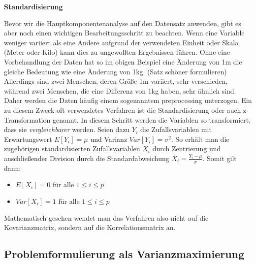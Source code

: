 \textbf{Standardisierung}

Bevor wir die Hauptkomponentenanalyse auf den Datensatz anwenden, gibt es aber noch einen wichtigen Bearbeitungsschritt zu beachten. Wenn eine Variable weniger variiert als eine Andere aufgrund der verwendeten Einheit oder Skala (Meter oder Kilo) kann dies zu ungewollten Ergebnissen führen. Ohne eine Vorbehandlung der Daten hat so im obigen Beispiel eine Änderung von 1m die gleiche Bedeutung wie eine Änderung von 1kg. (Satz schöner formulieren) Allerdings sind zwei Menschen, deren Größe 1m variiert, sehr verschieden, während zwei Menschen, die eine Differenz von 1kg haben, sehr ähnlich sind. Daher werden die Daten häufig einem sogenanntem preprocessing unterzogen. Ein zu diesem Zweck oft verwendetes Verfahren ist die Standardisierung oder auch z-Transformation genannt. In diesem Schritt werden die Variablen so transformiert, dass sie \textit{vergleichbarer} werden. Seien dazu $Y_i$ die Zufallsvariablen mit Erwartungswert $E[Y_i] = \mu$ und Varianz $Var[Y_i] = \sigma^2$. So erhält man die zugehörigen standardisierten Zufallsvariablen $X_i$ durch Zentrierung und anschließender Division durch die Standardabweichung $X_i = \frac{Y_i - \mu}{\sigma}$. Somit gilt dann:
\begin{itemize}
\item $E[X_i] = 0$ für alle $1 \leq i \leq p$
\item $Var[X_i] = 1$ für alle $1 \leq i \leq p$
\end{itemize}

Mathematisch gesehen wendet man das Verfahren also nicht auf die Kovarianzmatrix, sondern auf die Korrelationsmatrix an.

\subsection{Problemformulierung als Varianzmaximierung}

